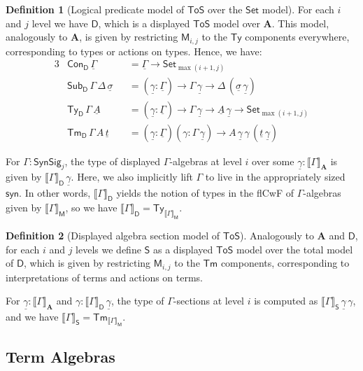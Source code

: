 \documentclass{article}
\theoremstyle{definition}
\newtheorem{definition}{Definition}
\theoremstyle{theorem}
\newcommand{\Con}{\mathsf{Con}}
\newcommand{\Sub}{\mathsf{Sub}}
\newcommand{\Tm}{\mathsf{Tm}}
\newcommand{\Ty}{\mathsf{Ty}}
\newcommand{\ra}{\rightarrow}
\newcommand{\Set}{\mathsf{Set}}
\newcommand{\ToS}{\mathsf{ToS}}
\newcommand{\syn}{\mathsf{syn}}
\newcommand{\SynSig}{\mathsf{SynSig}}
\newcommand{\bA}{\boldsymbol{A}}
\newcommand{\bM}{\boldsymbol{\mathsf{M}}}
\newcommand{\bS}{\boldsymbol{\mathsf{S}}}
\newcommand{\bD}{\boldsymbol{\mathsf{D}}}
\newcommand{\ul}[1]{\underline{#1}}
\newcommand{\ulGamma}{\ul{\Gamma}}
\newcommand{\ulgamma}{\ul{\gamma}}
\newcommand{\ulsigma}{\ul{\sigma}}
\newcommand{\ult}{\ul{t}}
\newcommand{\ulA}{\ul{A}}
\newcommand{\llb}{\llbracket}
\newcommand{\rrb}{\rrbracket}
\begin{document}
\begin{definition}[Logical predicate model of $\ToS$ over the $\Set$ model]
For each $i$ and $j$ level we have $\bD$, which is a displayed $\ToS$ model over
$\bA$. This model, analogously to $\bA$, is given by restricting $\bM_{i,j}$ to
the $\Ty$ components everywhere, corresponding to types or actions on
types. Hence, we have:
\begin{alignat*}{3}
  & \Con_{\bD}\,\ulGamma && = \ulGamma \ra \Set_{\max(i+1, j)} \\
  & \Sub_{\bD}\,\Gamma\,\Delta\,\ulsigma && = (\ulgamma : \ulGamma) \ra \Gamma\,\ulgamma \ra \Delta\,(\ulsigma\,\ulgamma)\\
  & \Ty_{\bD}\,\Gamma\,\ulA && = (\ulgamma : \ulGamma) \ra \Gamma\,\ulgamma \ra \ulA\,\ulgamma \ra \Set_{\max(i+1, j)}\\
  & \Tm_{\bD}\,\Gamma\,A\,\ult && = (\ulgamma : \ulGamma)(\gamma : \Gamma\,\ulgamma)
    \ra A\,\ulgamma\,\gamma\,(\ult\,\ulgamma)
\end{alignat*}
\end{definition}

For $\Gamma : \SynSig_j$, the type of displayed $\Gamma$-algebras at level $i$
over some $\ulgamma : \llb\Gamma\rrb_{\bA}$ is given by
$\llb\Gamma\rrb_{\bD}\,\ulgamma$. Here, we also implicitly lift $\Gamma$ to live
in the appropriately sized $\syn$. In other words, $\llb\Gamma\rrb_{\bD}$ yields
the notion of types in the flCwF of $\Gamma$-algebras given by
$\llb\Gamma\rrb_{\bM}$, so we have $\llb\Gamma\rrb_{\bD} = \Ty_{\llb\Gamma\rrb_{\bM}}$.

\begin{definition}[Displayed algebra section model of $\ToS$] Analogously to
$\bA$ and $\bD$, for each $i$ and $j$ levels we define $\bS$ as a displayed
$\ToS$ model over the total model of $\bD$, which is given by restricting
$\bM_{i,j}$ to the $\Tm$ components, corresponding to interpretations of terms and
actions on terms.

For $\ulgamma : \llb\Gamma\rrb_{\bA}$ and $\gamma :
\llb\Gamma\rrb_{\bD}\,\ulgamma$, the type of $\Gamma$-sections at level $i$ is
computed as $\llb\Gamma\rrb_{\bS}\,\ulgamma\,\gamma$, and we have
$\llb\Gamma\rrb_{\bS} = \Tm_{\llb\Gamma\rrb_{\bM}}$.
\end{definition}

\subsection{Term Algebras}
\end{document}
